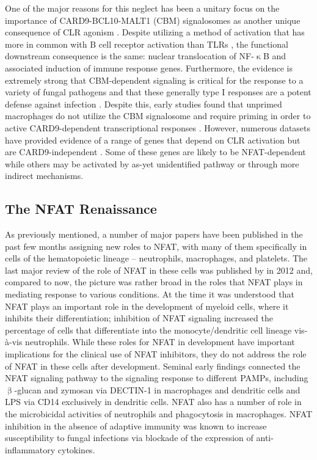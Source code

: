 One of the major reasons for this neglect has been a unitary focus on the importance of CARD9\hyp{}BCL10\hyp{}MALT1 (CBM) signalosomes as another unique consequence of CLR agonism \citep{Drummond2011a, Drummond2016, Drummond2018, Marakalala2010, Marakalala2017}. Despite utilizing a method of activation that has more in common with B cell receptor activation than TLRs \citep{Monroe2006}, the functional downstream consequence is the same: nuclear translocation of NF\hyp{}$\upkappa$B and associated induction of immune response genes. Furthermore, the evidence is extremely strong that CBM\hyp{}dependent signaling is critical for the response to a variety of fungal pathogens and that these generally type I responses are a potent defense against infection \citep{Drummond2018, Hardison2012, Willment2008}. Despite this, early studies found that unprimed macrophages do not utilize the CBM signalosome and require priming in order to active CARD9\hyp{}dependent transcriptional responses \citep{Goodridge2009}. However, numerous datasets have provided evidence of a range of genes that depend on CLR activation but are CARD9\hyp{}independent \citep{Deerhake2021}. Some of these genes are likely to be NFAT\hyp{}dependent while others may be activated by as\hyp{}yet unidentified pathway or through more indirect mechanisms. 

\subsection{The NFAT Renaissance}\label{nouveaunfat}

As previously mentioned, a number of major papers have been published in the past few months assigning new roles to NFAT, with many of them specifically in cells of the hematopoietic lineage -- neutrophils, macrophages, and platelets. The last major review of the role of NFAT in these cells was published by \citeauthor{Fric2012a} in 2012 and, compared to now, the picture was rather broad in the roles that NFAT plays in mediating response to various conditions. At the time it was understood that NFAT plays an important role in the development of myeloid cells, where it inhibits their differentiation; inhibition of NFAT signaling increased the percentage of cells that differentiate into the monocyte/dendritic cell lineage vis\hyp{}\`{a}\hyp{}vis neutrophils. While these roles for NFAT in development have important implications for the clinical use of NFAT inhibitors, they do not address the role of NFAT in these cells after development. Seminal early findings connected the NFAT signaling pathway to the signaling response to different PAMPs, including $\upbeta$\hyp{}glucan and zymosan via DECTIN\hyp{}1 in macrophages and dendritic cells and LPS via CD14 exclusively in dendritic cells. NFAT also has a number of role in the microbicidal activities of neutrophils and phagocytosis in macrophages. NFAT inhibition in the absence of adaptive immunity was known to increase susceptibility to fungal infections via blockade of the expression of anti\hyp{}inflammatory cytokines. 

